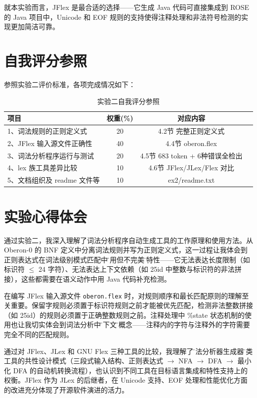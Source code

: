 就本实验而言，JFlex 是最合适的选择——它生成 Java 代码可直接集成到 ROSE 的 Java 项目中，Unicode 和 EOF 规则的支持使得注释处理和非法符号检测的实现更加简洁可靠。

\section{自我评分参照}

参照实验二评价标准，各项完成情况如下：

\begin{table}[htbp]
    \centering
    \begin{tabular}{|p{4.5cm}|c|c|p{4.5cm}|}
    \hline
    \textbf{项目} & \textbf{权重(\%)} & \textbf{对应内容} \\
    \hline
    1、词法规则的正则定义式 & 20 & 4.2节 完整正则定义式 \\
    2、JFlex 输入源文件正确性 & 40 & 4.4节 oberon.flex \\
    3、词法分析程序运行与测试 & 20 & 4.5节 683 token + 6种错误全检出 \\
    4、lex 族工具差异比较 & 10 & 4.6节 JFlex/JLex/Flex 对比 \\
    5、文档组织及 readme 文件等 & 10 & ex2/readme.txt \\
    \hline
    \end{tabular}
    \caption{实验二自我评分参照}
    \label{tab:self-eval-ex2}
\end{table}

\section{实验心得体会}

通过实验二，我深入理解了词法分析程序自动生成工具的工作原理和使用方法。从 Oberon-0 的 BNF 定义中分离词法规则并写为正则定义式，这一过程让我体会到正则表达式在词法级别模式匹配中\"够用但不完美\"的特性——它无法表达长度限制（如标识符 $\le$ 24 字符）、无法表达上下文依赖（如 25id 中整数与标识符的非法拼接），这些都需要在语义动作中用 Java 代码补充检测。

在编写 JFlex 输入源文件 \texttt{oberon.flex} 时，对规则顺序和最长匹配原则的理解至关重要。保留字规则必须置于标识符规则之前才能被优先匹配，检测非法整数拼接（如 25id）的规则必须置于正确整数规则之前。注释处理中 \%state 状态机制的使用也让我切实体会到词法分析中\"上下文\"的概念——注释内的字符与注释外的字符需要完全不同的匹配规则。

通过对 JFlex、JLex 和 GNU Flex 三种工具的比较，我理解了\"词法分析器生成器\"这类工具的共性设计模式（三段式输入结构、正则表达式 $\to$ NFA $\to$ DFA $\to$ 最小化 DFA 的自动机转换流程），也认识到不同工具在目标语言集成和特性支持上的权衡。JFlex 作为 JLex 的后继者，在 Unicode 支持、EOF 处理和性能优化方面的改进充分体现了开源软件演进的活力。
